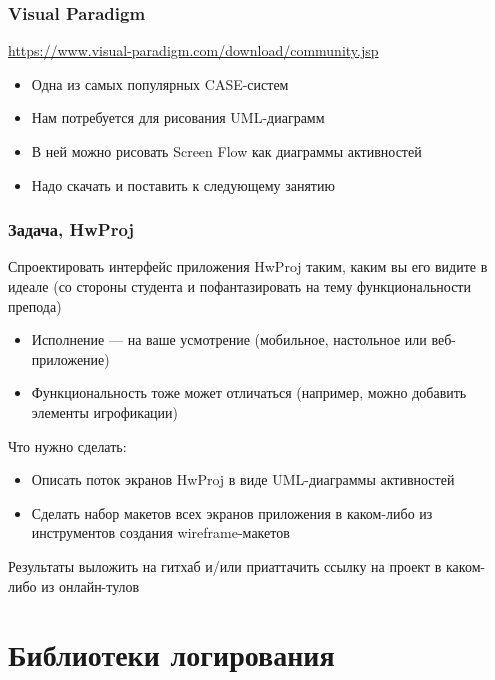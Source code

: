 \documentclass[xetex,mathserif,serif]{beamer}
\begin{document}
	\begin{frame}
		\frametitle{Visual Paradigm}
		\url{https://www.visual-paradigm.com/download/community.jsp}
		\begin{itemize}
			\item Одна из самых популярных CASE-систем
			\item Нам потребуется для рисования UML-диаграмм
			\item В ней можно рисовать Screen Flow как диаграммы активностей
			\item Надо скачать и поставить к следующему занятию
		\end{itemize}
	\end{frame}

	\begin{frame}
		\frametitle{Задача, HwProj}
		Спроектировать интерфейс приложения HwProj таким, каким вы его видите в идеале (со стороны студента и пофантазировать на тему функциональности препода)
		\begin{itemize} 
			\item Исполнение --- на ваше усмотрение (мобильное, настольное или веб-приложение)
			\item Функциональность тоже может отличаться (например, можно добавить элементы игрофикации)
		\end{itemize} 
		Что нужно сделать:
		\begin{itemize} 
			\item Описать поток экранов HwProj в виде UML-диаграммы активностей
			\item Сделать набор макетов всех экранов приложения в каком-либо из инструментов создания wireframe-макетов 
		\end{itemize} 
		Результаты выложить на гитхаб и/или приаттачить ссылку на проект в каком-либо из онлайн-тулов
	\end{frame}

	\section{Библиотеки логирования}
\end{document}
